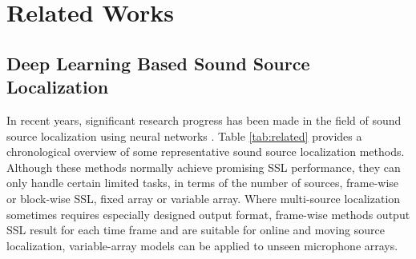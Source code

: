 \documentclass[lettersize,journal]{IEEEtran}
\begin{document}
\section{Related Works}\label{sec:related}
\subsection{Deep Learning Based Sound Source Localization}
In recent years, significant research progress has been made in the field of sound source localization using neural networks \cite{grumiaux2022survey, He2021NeuralNA, Grumiaux2021SaladnetSM, yang2021learning,DiazGuerra2020RobustSS,DiazGuerra2022DirectionOA, Fu2022IterativeSS,Yin2022MIMODoAnetMI,Yang2022SRPDNNLD,Kowalk2022GeometryAwareDE,Wang2023FramewiseMS,Cho2023SRSRPSB,WYBIS23}. Table \ref{tab:related} provides a chronological overview of some representative sound source localization methods. Although these methods normally achieve promising SSL performance, they can only handle certain limited tasks, in terms of the number of sources, frame-wise or block-wise SSL, fixed array or variable array. Where multi-source localization sometimes requires especially designed output format, frame-wise methods output SSL result for each time frame and are suitable for online and moving source localization, variable-array models can be applied to unseen microphone arrays.  
\end{document}
